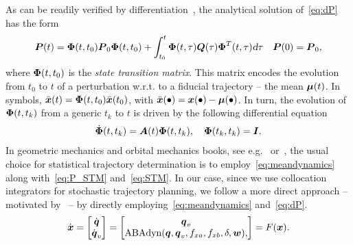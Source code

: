 As can be readily verified by differentiation~\cite{Gajic:LyapunovMatrixEquation:2010}, the analytical solution of~\eqref{eq:dP} has the form
\begin{align}\label{eq:P_STM}
\bP(t) = \bPhi(t,t_0) \bP_0 \bPhi(t,t_0)+\int_{t_0}^{t} \bPhi(t,\tau) \bQ(\tau) \bPhi^T(t,\tau) \dd \tau \quad \bP(0)=\bP_0,
\end{align}
where $\boldsymbol{\Phi}(t,t_0)$ is the \emph{state transition matrix}. This matrix encodes the evolution from $t_0$ to $t$ of a perturbation w.r.t. to a fiducial trajectory -- the mean $\boldsymbol{\mu}(t)$. In symbols, $\bar{\boldsymbol{x}}(t) = \boldsymbol{\Phi}(t,t_0) \bar{\boldsymbol{x}}(t_0)$, with $\bar{\boldsymbol{x}}(\bullet) =\boldsymbol{x}(\bullet) - \boldsymbol{\mu}(\bullet) $. In turn, the evolution of $\boldsymbol{\Phi}(t,t_k)$ from a generic $t_k$ to $t$ is driven by the following differential equation
\begin{align}\label{eq:STM}
\dbPhi(t,t_k) = \bA(t)\bPhi(t,t_k), \quad \bPhi(t_k, t_k) = \bI.
\end{align}
In geometric mechanics and orbital mechanics books, see e.g.~\cite{Maruskin:DynamicalSystemsGeometric:2018} or~\cite{Tapley:StatisticalOrbitDetermination:2004}, the usual choice for statistical trajectory determination is to employ~\eqref{eq:meandynamics} along with~\eqref{eq:P_STM} and~\eqref{eq:STM}. In our case, since we use collocation integrators for stochastic trajectory planning, we follow a more direct approach -- motivated by~\cite{Gillis:PracticalMethodsApproximate:2015} -- by directly employing~\eqref{eq:meandynamics} and~\eqref{eq:dP}.
\begin{align}
\dbx = \begin{bmatrix}
              \dot{\bq}\\
              \dot{\bq}_v
             \end{bmatrix} =
             \begin{bmatrix}
              \bq_v\\
              \text{ABA}\text{dyn}(\bq, \bq_v, f_{xa}, f_{xb}, \delta, \bw),
             \end{bmatrix} = F(\bx).
	\label{eq:ABA_dyn}
\end{align}
               

